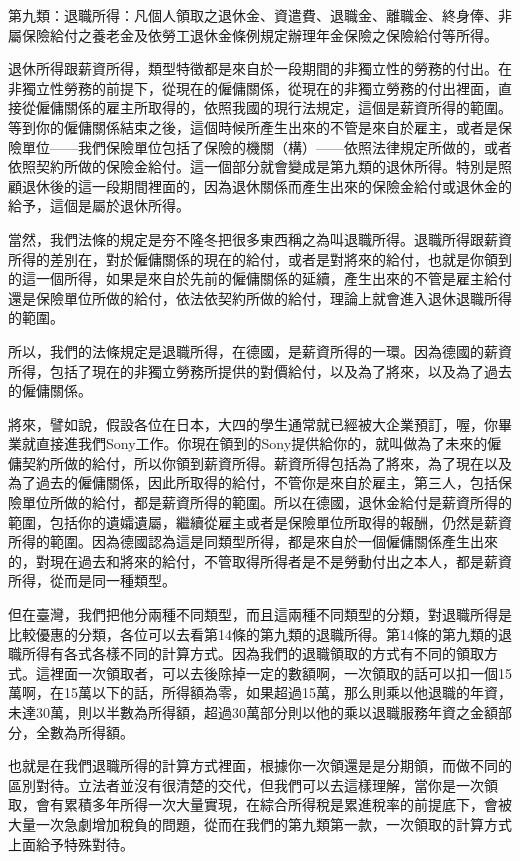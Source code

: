 \documentclass[oneside,sub3section]{ctexbook}
\begin{document}
第九類：退職所得：凡個人領取之退休金、資遣費、退職金、離職金、終身俸、非屬保險給付之養老金及依勞工退休金條例規定辦理年金保險之保險給付等所得。

退休所得跟薪資所得，類型特徵都是來自於一段期間的非獨立性的勞務的付出。在非獨立性勞務的前提下，從現在的僱傭關係，從現在的非獨立勞務的付出裡面，直接從僱傭關係的雇主所取得的，依照我國的現行法規定，這個是薪資所得的範圍。等到你的僱傭關係結束之後，這個時候所產生出來的不管是來自於雇主，或者是保險單位------我們保險單位包括了保險的機關（構）------依照法律規定所做的，或者依照契約所做的保險金給付。這一個部分就會變成是第九類的退休所得。特別是照顧退休後的這一段期間裡面的，因為退休關係而產生出來的保險金給付或退休金的給予，這個是屬於退休所得。

當然，我們法條的規定是夯不隆冬把很多東西稱之為叫退職所得。退職所得跟薪資所得的差別在，對於僱傭關係的現在的給付，或者是對將來的給付，也就是你領到的這一個所得，如果是來自於先前的僱傭關係的延續，產生出來的不管是雇主給付還是保險單位所做的給付，依法依契約所做的給付，理論上就會進入退休退職所得的範圍。

所以，我們的法條規定是退職所得，在德國，是薪資所得的一環。因為德國的薪資所得，包括了現在的非獨立勞務所提供的對價給付，以及為了將來，以及為了過去的僱傭關係。

將來，譬如說，假設各位在日本，大四的學生通常就已經被大企業預訂，喔，你畢業就直接進我們Sony工作。你現在領到的Sony提供給你的，就叫做為了未來的僱傭契約所做的給付，所以你領到薪資所得。薪資所得包括為了將來，為了現在以及為了過去的僱傭關係，因此所取得的給付，不管你是來自於雇主，第三人，包括保險單位所做的給付，都是薪資所得的範圍。所以在德國，退休金給付是薪資所得的範圍，包括你的遺孀遺屬，繼續從雇主或者是保險單位所取得的報酬，仍然是薪資所得的範圍。因為德國認為這是同類型所得，都是來自於一個僱傭關係產生出來的，對現在過去和將來的給付，不管取得所得者是不是勞動付出之本人，都是薪資所得，從而是同一種類型。

但在臺灣，我們把他分兩種不同類型，而且這兩種不同類型的分類，對退職所得是比較優惠的分類，各位可以去看第14條的第九類的退職所得。第14條的第九類的退職所得有各式各樣不同的計算方式。因為我們的退職領取的方式有不同的領取方式。這裡面一次領取者，可以去後除掉一定的數額啊，一次領取的話可以扣一個15萬啊，在15萬以下的話，所得額為零，如果超過15萬，那么則乘以他退職的年資，未達30萬，則以半數為所得額，超過30萬部分則以他的乘以退職服務年資之金額部分，全數為所得額。

也就是在我們退職所得的計算方式裡面，根據你一次領還是是分期領，而做不同的區別對待。立法者並沒有很清楚的交代，但我們可以去這樣理解，當你是一次領取，會有累積多年所得一次大量實現，在綜合所得稅是累進稅率的前提底下，會被大量一次急劇增加稅負的問題，從而在我們的第九類第一款，一次領取的計算方式上面給予特殊對待。
\end{document}
